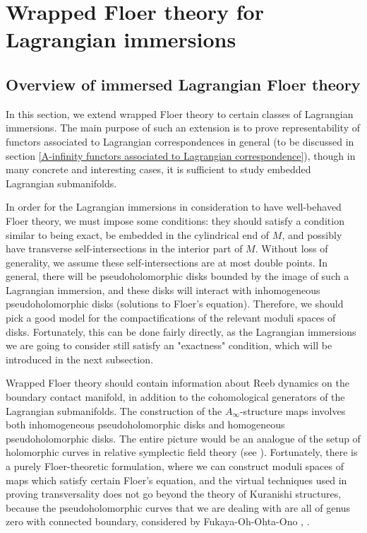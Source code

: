 \documentclass{amsart}
\numberwithin{equation}{section}
\numberwithin{figure}{section}
\begin{document}
\section{Wrapped Floer theory for Lagrangian immersions}\label{the immersed wrapped Fukaya category}

\subsection{Overview of immersed Lagrangian Floer theory}
	In this section, we extend wrapped Floer theory to certain classes of Lagrangian immersions. The main purpose of such an extension is to prove representability of functors associated to Lagrangian correspondences in general (to be discussed in section \ref{A-infinity functors associated to Lagrangian correspondence}), though in many concrete and interesting cases, it is sufficient to study embedded Lagrangian submanifolds. \par
	In order for the Lagrangian immersions in consideration to have well-behaved Floer theory, we must impose some conditions: they should satisfy a condition similar to being exact, be embedded in the cylindrical end of $M$, and possibly have transverse self-intersections in the interior part of $M$. Without loss of generality, we assume these self-intersections are at most double points. In general, there will be pseudoholomorphic disks bounded by the image of such a Lagrangian immersion, and these disks will interact with inhomogeneous pseudoholomorphic disks (solutions to Floer's equation). Therefore, we should pick a good model for the compactifications of the relevant moduli spaces of disks. Fortunately, this can be done fairly directly, as the Lagrangian immersions we are going to consider still satisfy an "exactness" condition, which will be introduced in the next subsection. \par
	Wrapped Floer theory should contain information about Reeb dynamics on the boundary contact manifold, in addition to the cohomological generators of the Lagrangian submanifolds. The construction of the $A_{\infty}$-structure maps involves both inhomogeneous pseudoholomorphic disks and homogeneous pseudoholomorphic disks. The entire picture would be an analogue of the setup of holomorphic curves in relative symplectic field theory (see \cite{BEHWZ}). Fortunately, there is a purely Floer-theoretic formulation, where we can construct moduli spaces of maps which satisfy certain Floer's equation, and the virtual techniques used in proving transversality does not go beyond the theory of Kuranishi structures, because the pseudoholomorphic curves that we are dealing with are all of genus zero with connected boundary, considered by Fukaya-Oh-Ohta-Ono \cite{FOOO1}, \cite{FOOO2}. \par
\end{document}
